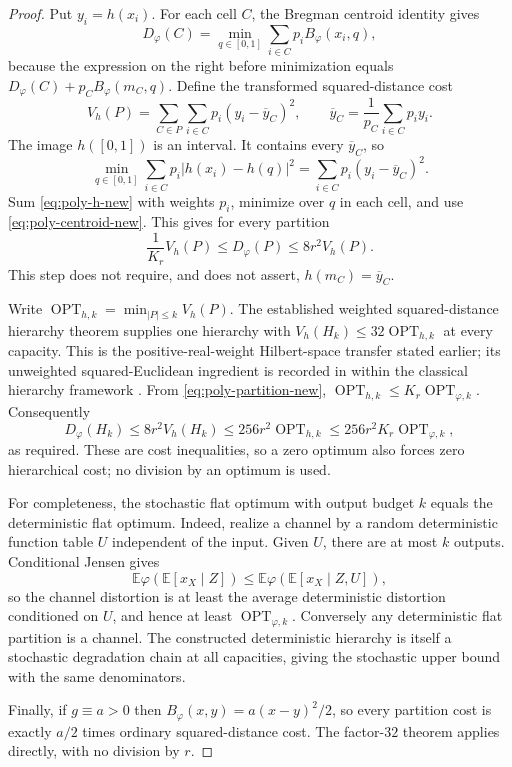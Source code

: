 \begin{proof}
Put $y_i=h(x_i)$. For each cell $C$, the Bregman centroid identity gives
\begin{equation}
 D_\varphi(C)=\min_{q\in[0,1]}\sum_{i\in C}p_iB_\varphi(x_i,q),
 \label{eq:poly-centroid-new}
\end{equation}
because the expression on the right before minimization equals
$D_\varphi(C)+p_CB_\varphi(m_C,q)$. Define the transformed squared-distance
cost
\[
 V_h(P)=\sum_{C\in P}\sum_{i\in C}p_i(y_i-\overline y_C)^2,
 \qquad \overline y_C=\frac{1}{p_C}\sum_{i\in C}p_iy_i.
\]
The image $h([0,1])$ is an interval. It contains every
$\overline y_C$, so
\[
 \min_{q\in[0,1]}\sum_{i\in C}p_i|h(x_i)-h(q)|^2
 =\sum_{i\in C}p_i(y_i-\overline y_C)^2.
\]
Sum \eqref{eq:poly-h-new} with weights $p_i$, minimize over $q$ in each
cell, and use \eqref{eq:poly-centroid-new}. This gives for every partition
\begin{equation}
 \frac{1}{K_r}V_h(P)\le D_\varphi(P)\le8r^2V_h(P).
 \label{eq:poly-partition-new}
\end{equation}
This step does not require, and does not assert,
$h(m_C)=\overline y_C$.

Write $\operatorname{OPT}_{h,k}=\min_{|P|\le k}V_h(P)$.
The established weighted squared-distance hierarchy theorem supplies one
hierarchy with
$V_h(H_k)\le32\operatorname{OPT}_{h,k}$ at every capacity.
This is the positive-real-weight Hilbert-space transfer stated earlier;
its unweighted squared-Euclidean ingredient is recorded in
\cite[Lemma 2.13 and Theorem 1.2]{grosswendt} within the classical
hierarchy framework \cite{lin}.
From \eqref{eq:poly-partition-new},
$\operatorname{OPT}_{h,k}\le K_r\operatorname{OPT}_{\varphi,k}$.
Consequently
\[
 D_\varphi(H_k)
 \le8r^2V_h(H_k)
 \le256r^2\operatorname{OPT}_{h,k}
 \le256r^2K_r\operatorname{OPT}_{\varphi,k},
\]
as required. These are cost inequalities, so a zero optimum also forces
zero hierarchical cost; no division by an optimum is used.

For completeness, the stochastic flat optimum with output budget $k$
equals the deterministic flat optimum. Indeed, realize a channel by a
random deterministic function table $U$ independent of the input. Given
$U$, there are at most $k$ outputs. Conditional Jensen gives
\[
 \mathbb E\varphi(\mathbb E[x_X\mid Z])
 \le\mathbb E\varphi(\mathbb E[x_X\mid Z,U]),
\]
so the channel distortion is at least the average deterministic distortion
conditioned on $U$, and hence at least $\operatorname{OPT}_{\varphi,k}$.
Conversely any deterministic flat partition is a channel. The constructed
deterministic hierarchy is itself a stochastic degradation chain at all
capacities, giving the stochastic upper bound with the same denominators.

Finally, if $g\equiv a>0$ then
$B_\varphi(x,y)=a(x-y)^2/2$, so every partition cost is exactly
$a/2$ times ordinary squared-distance cost. The factor-$32$ theorem applies
directly, with no division by $r$.
\end{proof}

